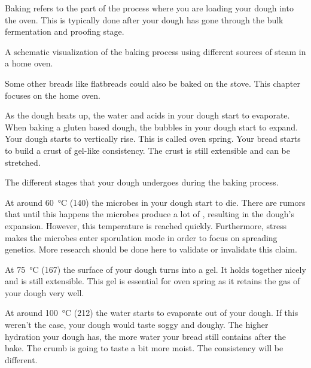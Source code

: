 \begin{quoting}
Baking refers to the part of the process where you are loading
your dough into the oven. This is typically done after your
dough has gone through the bulk fermentation and proofing stage.
\end{quoting}

\begin{flowchart}[!htb]
\begin{center}
  
  \caption[Different steaming methods]{A schematic visualization of the baking
      process using different sources of steam in a home oven.}%
  \label{fig:baking-process}
\end{center}
\end{flowchart}

Some other breads like flatbreads
could also be baked on the stove. This chapter focuses on the
home oven.

As the dough heats up, the water and acids
in your dough start to evaporate. When baking
a gluten based dough, the bubbles in your dough start to expand.
Your dough starts to vertically rise. This is called oven spring.
Your bread starts to build a crust of gel-like consistency. The crust is still
extensible and can be stretched.

\begin{table}[htp!]
    \begin{center}
        
        \caption[Stages of dough during backing]{The different stages that
            your dough undergoes during the baking process.}
    \end{center}
\end{table}

At around  \qty{60}{\degreeCelsius} (\qty{140}{\degF}) the microbes in your dough start to die.
There are rumors that until this happens the microbes produce
a lot of , resulting in the dough's expansion. However, this temperature
is reached quickly. Furthermore, stress makes the microbes
enter sporulation mode in order to focus on spreading genetics.
More research should be done here to validate or invalidate this
claim.

At  \qty{75}{\degreeCelsius} (\qty{167}{\degF}) the surface of your dough turns into a gel. It
holds together nicely and is still extensible. This gel is essential
for oven spring as it retains the gas of your dough very well.

At around  \qty{100}{\degreeCelsius} (\qty{212}{\degF}) the water starts to evaporate out of your
dough. If this weren't the case, your dough would taste soggy and
doughy. The higher hydration your dough has, the more water your bread
still contains after the bake. The crumb is going to taste a bit
more moist. The consistency will be different.

